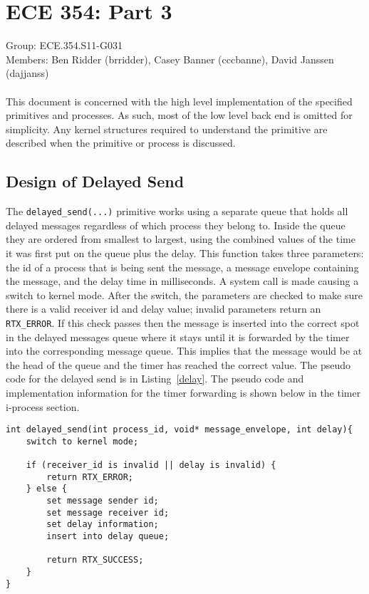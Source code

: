 \documentclass[oneside]{article}
\begin{document}
\lstset{language=C, 
        frame=single, 
        breaklines=true,
        basicstyle=\small\ttfamily,
        columns=fullflexible}
\section*{ECE 354: Part 3}
Group: ECE.354.S11-G031 \\
Members: Ben Ridder (brridder), Casey Banner (cccbanne), 
David Janssen (dajjanss) \\ \\
This document is concerned with the high level implementation of the specified
primitives and processes. As such, most of the low level back end is omitted
for simplicity. Any kernel structures required to understand the primitive are
described when the primitive or process is discussed.

\subsection*{Design of Delayed Send} 
The \texttt{delayed\_send(...)} primitive works using a separate queue that
holds all delayed messages regardless of which process they belong to. Inside
the queue they are ordered from smallest to largest, using the combined values
of the time it was first put on the queue plus the delay.  This function takes
three parameters: the id of a process that is being sent the message, a
message envelope containing the message, and the delay time in milliseconds. A
system call is made causing a switch to kernel mode.  After the switch, the
parameters are checked to make sure there is a valid receiver id and delay
value; invalid parameters return an \texttt{RTX\_ERROR}. If this check passes
then the message is inserted into the correct spot in the delayed messages
queue where it stays until it is forwarded by the timer into the corresponding
message queue. This implies that the message would be at the head of the queue
and the timer has reached the correct value. The pseudo code for the delayed
send is in Listing~\ref{delay}. The pseudo code and implementation information
for the timer forwarding is shown below in the timer i-process section.

\begin{lstlisting}
int delayed_send(int process_id, void* message_envelope, int delay){
    switch to kernel mode;

    if (receiver_id is invalid || delay is invalid) {
        return RTX_ERROR;
    } else {
        set message sender id;
        set message receiver id;
        set delay information;
        insert into delay queue;

        return RTX_SUCCESS;
    }
}
\end{lstlisting}
\end{document}
